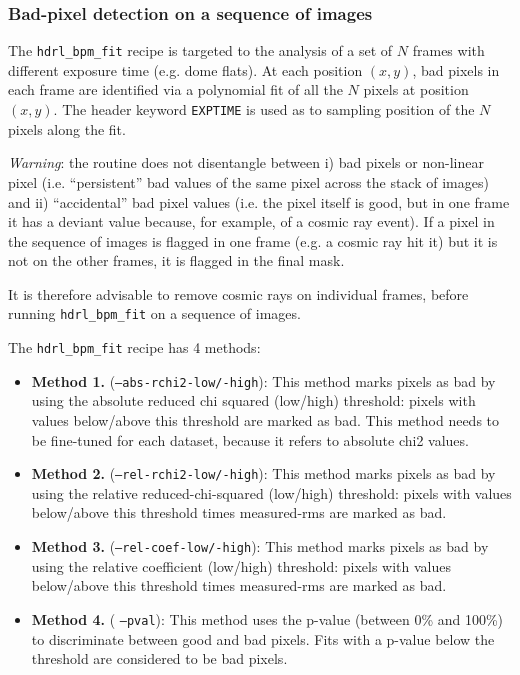 \subsubsection{Bad-pixel detection on a sequence of images}

The {\tt hdrl\_bpm\_fit} recipe is targeted to the analysis of a set
of $N$ frames with different exposure time (e.g.  dome flats). At each
position $(x, y)$, bad pixels in each frame are identified via a
polynomial fit of all the $N$ pixels at position $(x, y)$. The header
keyword {\tt EXPTIME} is used as to sampling position of the $N$
pixels along the fit.


{\it Warning}: the routine does not disentangle between i) bad pixels
or non-linear pixel (i.e. ``persistent'' bad values of the same pixel
across the stack of images) and ii) ``accidental'' bad pixel values
(i.e.  the pixel itself is good, but in one frame it has a deviant
value because, for example, of a cosmic ray event). If a pixel in the
sequence of images is flagged in one frame (e.g. a cosmic ray hit it)
but it is not on the other frames, it is flagged in the final mask.

It is therefore advisable to remove cosmic rays on individual frames,
before running {\tt hdrl\_bpm\_fit} on a sequence of images.


The  {\tt hdrl\_bpm\_fit}  recipe has 4 methods:

\begin{itemize}
\item {\bf Method 1.} ({\tt --abs-rchi2-low/-high}): This method marks pixels
  as bad by using the absolute reduced chi squared (low/high)
  threshold: pixels with values below/above this threshold are marked
  as bad. This method needs to be fine-tuned for each dataset, because
  it refers to absolute chi2 values.
                                                                             
\item {\bf Method 2.} ({\tt --rel-rchi2-low/-high}): This method marks
  pixels as bad by using the relative reduced-chi-squared (low/high)
  threshold: pixels with values below/above this threshold times
  measured-rms are marked as bad.
                                                                             
\item {\bf Method 3.} ({\tt --rel-coef-low/-high}): This method marks pixels
  as bad by using the relative coefficient (low/high) threshold:
  pixels with values below/above this threshold times measured-rms are
  marked as bad.
                                                                             
\item {\bf Method 4.}  ( {\tt --pval}): This method uses the p-value
  (between 0\% and 100\%) to discriminate between good and bad pixels.
  Fits with a p-value below the threshold are considered to be bad
  pixels.

\end{itemize}

